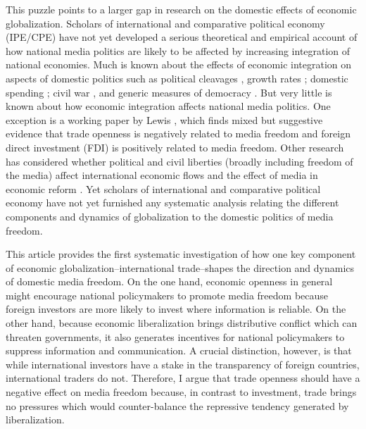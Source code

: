 \documentclass[12pt,a4paper]{article}
\begin{document}
This puzzle points to a larger gap in research on the domestic effects of economic globalization. Scholars of international and comparative political economy (IPE/CPE) have not yet developed a serious theoretical and empirical account of how national media politics are likely to be affected by increasing integration of national economies. Much is known about the effects of economic integration on aspects of domestic politics such as political cleavages \parencites{Rogowski:1987ip}{Rogowski:1989wm}{Hiscox:2002us}{hiscox2002international}, growth rates \parencite{Rodriguez:2001uw}; domestic spending \parencites{Rodrik:1998te}{Burgoon:2001dp}; civil war \parencites{Barbieri:2005uk}{Bussmann:2007vx}, and generic measures of democracy \parencites{EICHENGREEN:2008gg}{Li:2003vj}. But very little is known about how economic integration affects national media politics. One exception is a working paper by Lewis \parencite*{Lewis:qDvYbWlU}, which finds mixed but suggestive evidence that trade openness is negatively related to media freedom and foreign direct investment (FDI) is positively related to media freedom. Other research has considered whether political and civil liberties (broadly including freedom of the media) affect international economic flows \parencite{Adam:2007gn} and the effect of media in economic reform \parencites{Coyne:2004bq}{Islam:2002uc}. Yet scholars of international and comparative political economy have not yet furnished any systematic analysis relating the different components and dynamics of globalization to the domestic politics of media freedom.

This article provides the first systematic investigation of how one key component of economic globalization--international trade--shapes the direction and dynamics of domestic media freedom. On the one hand, economic openness in general might encourage national policymakers to promote media freedom because foreign investors are more likely to invest where information is reliable. On the other hand, because economic liberalization brings distributive conflict which can threaten governments, it also generates incentives for national policymakers to suppress information and communication. A crucial distinction, however, is that while international investors have a stake in the transparency of foreign countries, international traders do not. Therefore, I argue that trade openness should have a negative effect on media freedom because, in contrast to investment, trade brings no pressures which would counter-balance the repressive tendency generated by liberalization.
\end{document}

